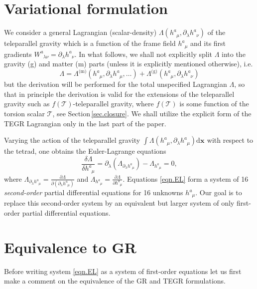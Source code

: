 \documentclass[
10pt, %
a4paper, %
oneside, %
headinclude,footinclude, %
BCOR5mm, %
]{scrartcl}
\newcommand{\pd}[1]{\partial_{#1}}
\newcommand{\dx}[1]{{\bm{\mathrm{d}x}^{#1}}}
\newcommand{\tetrsymbol}{h}
\newcommand{\tetr}[2]{\tetrsymbol^{#1}_{\phantom{#1}#2}}
\newcommand{\w}[2]{W^{#1}_{\phantom{#1}#2}}
\newcommand{\Lag}{\Lambda}	%
\newcommand{\Tscal}{\mathcal{T}}		%
\begin{document}
\section{Variational formulation}

We consider a general Lagrangian (scalar-density) $ \Lag(\tetr{a}{\mu},\pd{\lambda}\tetr{a}{\nu}) $ 
of the teleparallel gravity which is a function of the frame field $ \tetr{a}{\mu} $ and its first 
gradients $ \w{a}{\lambda\nu} = \pd{\lambda}\tetr{a}{\nu} $. In what follows, we shall not 
explicitly split $ \Lag $ 
into the gravity (g) and matter (m) parts (unless it is explicitly mentioned otherwise), i.e. 
\begin{equation}\label{eqn.Lagr.split}
	\Lag = \Lag^\text{(m)}(\tetr{a}{\mu},\pd{\lambda}\tetr{a}{\mu},\ldots) + 
	\Lag^\text{(g)}(\tetr{a}{\mu},\pd{\lambda}\tetr{a}{\nu}) 
\end{equation}
but the 
derivation will be performed for the total unspecified Lagrangian $ \Lag $, so that in principle 
the derivation 
is valid for the extensions of the teleparallel gravity such as $ f(\Tscal) $-teleparallel gravity, 
where $ f(\Tscal) $ is some function of the torsion scalar $ \Tscal $, see 
Section\,\ref{sec.closure}. We shall utilize the explicit form 
of the TEGR Lagrangian only in the last part of the paper.

Varying the action of the teleparallel gravity $ \int \Lag(\tetr{a}{\mu},\pd{\lambda}\tetr{a}{\mu}) 
\bm{\dx{}}$ 
with respect to 
the tetrad, one obtains the Euler-Lagrange equations 
\begin{equation}\label{eqn.EL}
\frac{\delta \Lambda}{\delta\tetr{a}{\mu}} = \pd{\lambda}(\Lag_{\pd{\lambda}\tetr{a}{\mu}}) - 
\Lag_{\tetr{a}{\mu}} = 0,
\end{equation}
where $ \Lag_{\pd{\lambda}\tetr{a}{\mu}} = \frac{\partial 
\Lag}{\partial(\pd{\lambda}\tetr{a}{\mu})} $ and $ 
\Lag_{\tetr{a}{\mu}} = \frac{\partial \Lag}{\partial\tetr{a}{\mu}} $. Equations \eqref{eqn.EL} 
form a system of 16 \emph{second-order} partial differential equations for 
16 unknowns $ \tetr{a}{\mu} $. Our goal is to replace this second-order system by an equivalent but 
larger system of only first-order partial differential equations.

\section{Equivalence to GR}

Before writing system \eqref{eqn.EL} as a system of first-order equations let us first make a 
comment on the equivalence of the GR and TEGR formulations. 
\end{document}
